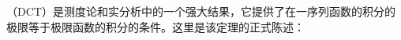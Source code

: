 
\begin{issues}
\issueDraft
\end{issues}


（DCT）是测度论和实分析中的一个强大结果，它提供了在一序列函数的积分的极限等于极限函数的积分的条件。这里是该定理的正式陈述：

